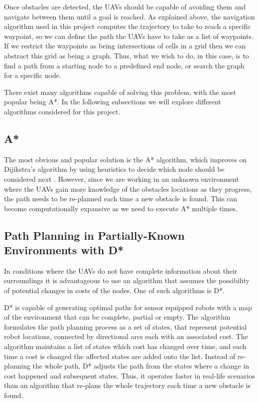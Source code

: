 Once obstacles are detected, the UAVs should be capable of avoiding them and navigate between them 
until a goal is reached. As explained above, the navigation algorithm used in this project computes
the trajectory to take to reach a specific waypoint, so we can define the path the UAVs have to take
as a list of waypoints. If we restrict the waypoints as being intersections of cells in a grid then
we can abstract this grid as being a graph. Thus, what we wish to do, in this case, is to find a path
from a starting node to a predefined end node, or search the graph for a specific node. 

There exist many algorithms capable of solving this problem, with the most popular being A*.
In the following subsections we will explore different algorithms considered for this project.


\subsection{A*}

The most obvious and popular solution is the A* algorithm, which improves on Dijikstra's algorithm
by using heuristics to decide which node should be considered next \autocite{ADA}. However, since we 
are working in an unknown environment where the UAVs gain more knowledge of the obstacles locations as
they progress, the path needs to be re-planned each time a new obstacle is found. This can become
computationally expansive as we need to execute A* multiple times. 

\subsection{Path Planning in Partially-Known Environments with D*}

In conditions where the UAVs do not have complete information about their surroundings it is 
advantageous to use an algorithm that assumes the possibility of potential changes in costs of the nodes. 
One of such algorithms is D*. 

D* is capable of generating optimal paths for sensor equipped robots with a map of the environment that 
can be complete, partial or empty. The algorithm formulates the path planning process as a set of states,
that represent potential robot locations, connected by directional arcs each with an associated cost. The 
algorithm maintains a list of states which cost has changed over time, and each time a cost is changed
the affected states are added onto the list. Instead of re-planning the whole path, D* adjusts the path
from the states where a change in cost happened and subsequent states. Thus, it operates faster in real-life
scenarios than an algorithm that re-plans the whole trajectory each time a new obstacle is found. \autocite{AS94}

